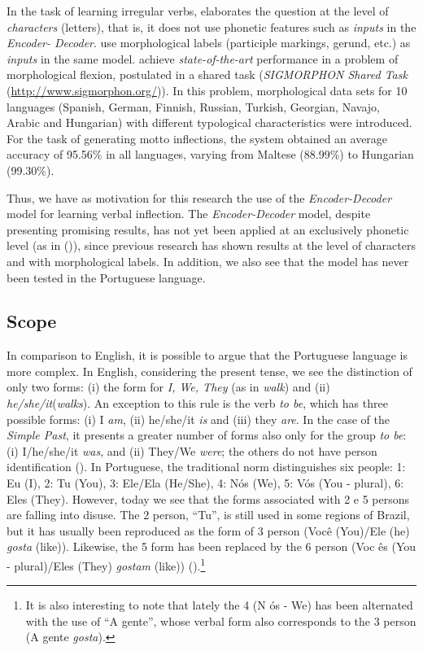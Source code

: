 In the task of learning irregular verbs, \cite{faruqui:2015} elaborates the question at the level of \textit{characters} (letters), that is, it does not use phonetic features such as \textit{inputs} in the \textit{Encoder- Decoder}. \cite{kann-schutze-2016-med} use morphological labels (participle markings, gerund, etc.) as \textit{inputs} in the same model. \cite{cotterell-sigmorphon2016} achieve  \textit{state-of-the-art} performance in a problem of morphological flexion, postulated in a shared task (\textit{SIGMORPHON Shared Task} (\url{http://www.sigmorphon.org/})). In this problem, morphological data sets for 10 languages (Spanish, German, Finnish, Russian, Turkish, Georgian, Navajo, Arabic and Hungarian) with different typological characteristics were introduced. For the task of generating motto inflections, the \cite{cotterell-sigmorphon2016} system obtained an average accuracy of 95.56\% in all languages, varying from
Maltese (88.99\%) to Hungarian (99.30\%).

Thus, we have as motivation for this research the use of the \textit{Encoder-Decoder} model for learning verbal inflection. The \textit{Encoder-Decoder} model, despite presenting promising results, has not yet been applied at an exclusively phonetic level (as in (\cite{rumelhart:1986})), since previous research has shown results at the level of characters and with morphological labels. In addition, we also see that the model has never been tested in the Portuguese language.


\subsection{Scope}
\label{sec:escopo}

In comparison to English, it is possible to argue that the Portuguese language is more complex. In English, considering the present tense, we see the distinction of only two forms: (i) the form for \textit{I, We, They} (as in \textit{walk}) and (ii) \textit{he/she/it}(\textit{walks}). An exception to this rule is the verb \textit{to be}, which has three possible forms: (i) I \textit{am}, (ii) he/she/it \textit{is} and (iii) they \textit{are}. In the case of the \textit{Simple Past}, it presents a greater number of forms also only for the group \textit{to be}: (i) I/he/she/it \textit{was}, and (ii) They/We \textit{were}; the others do not have person identification (\cite{Nelson:2010}). In Portuguese, the traditional norm distinguishes six people: 1: Eu (I), 2: Tu (You), 3: Ele/Ela (He/She), 4: Nós (We), 5: Vós (You - plural), 6: Eles (They). However, today we see that the forms associated with 2 e 5 persons are falling into disuse. The 2 person, “Tu”, is still used in some regions of Brazil, but it has usually been reproduced as the form of 3 person (Você (You)/Ele (he) \textit{gosta} (like)). Likewise, the 5 form has been replaced by the 6 person (Voc
ês (You - plural)/Eles (They) \textit{gostam} (like)) (\cite{1999:camara}).\footnote{It is also interesting to note that lately the 4 (N
ós - We) has been alternated with the use of “A gente”, whose verbal form also corresponds to the 3 person (A gente \textit{gosta}).}

